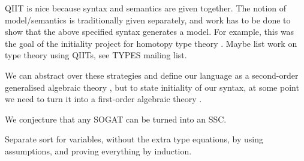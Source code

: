 \documentclass[sigplan,10pt,anonymous,review]{acmart}\settopmatter{printfolios=true,printccs=false,printacmref=false}
\begin{document}
QIIT is nice because syntax and semantics are given together. The
notion of model/semantics is traditionally given separately, and work
has to be done to show that the above specified syntax generates a
model. For example, this was the goal of the initiality project for
homotopy type theory \cite{brunerie}. Maybe list work on type theory
using QIITs, see TYPES mailing list.

We can abstract over these strategies and define our language as a
second-order generalised algebraic theory
\cite{DBLP:journals/corr/abs-1904-04097}, but to state initiality of
our syntax, at some point we need to turn it into a first-order
algebraic theory \cite{DBLP:conf/fscd/BocquetKS23}.

We conjecture that any SOGAT can be turned into an SSC.

Separate sort for variables, without the extra type equations, by
using assumptions, and proving everything by induction.

{}

\end{document}

